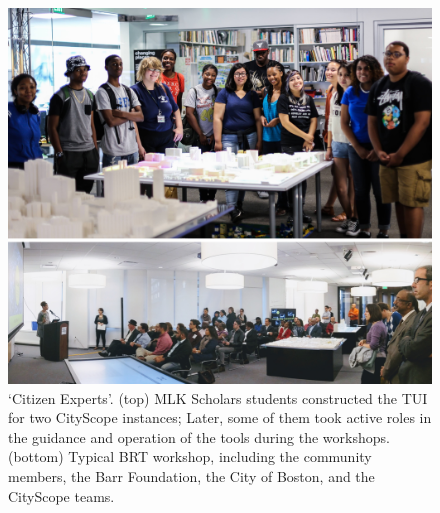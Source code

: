 {{        \begin{figure}[!htb]
            \begin{center}
                \includegraphics[width=1\textwidth]{chapters/consensus/BRT/figures/brt5.jpeg}
            \end{center}
            \caption{`Citizen Experts'. (top) MLK Scholars students constructed the TUI for two CityScope instances; Later, some of them took active roles in the guidance and operation of the tools during the workshops. (bottom) Typical BRT workshop, including the community members, the Barr Foundation, the City of Boston, and the CityScope teams.}
            \label{fig:brt_workshop}
        \end{figure}

}}
